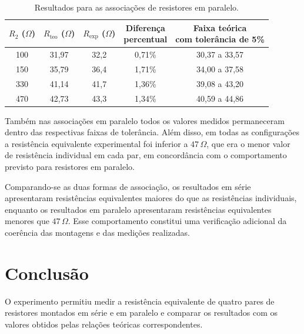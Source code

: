 \documentclass[a4paper,12pt]{article}
\begin{document}
\begin{table}[H]
  \centering
  \caption{Resultados para as associações de resistores em paralelo.}
  \label{tab:paralelo}
  \medskip

  \footnotesize
  \setlength{\tabcolsep}{4pt}
  \begin{tabular}{ccccc}
    \toprule
    \shortstack{$R_2$\\($\Omega$)}
    & \shortstack{$R_{\mathrm{teo}}$\\($\Omega$)}
    & \shortstack{$R_{\mathrm{exp}}$\\($\Omega$)}
    & \shortstack{\textbf{Diferença}\\\textbf{percentual}}
    & \shortstack{\textbf{Faixa teórica}\\\textbf{com tolerância de 5\%}} \\
    \midrule
    100 & 31,97 & 32,2 & 0,71\% & 30,37 a 33,57 \\
    150 & 35,79 & 36,4 & 1,71\% & 34,00 a 37,58 \\
    330 & 41,14 & 41,7 & 1,36\% & 39,08 a 43,20 \\
    470 & 42,73 & 43,3 & 1,34\% & 40,59 a 44,86 \\
    \bottomrule
  \end{tabular}
\end{table}

Também nas associações em paralelo todos os valores medidos permaneceram
dentro das respectivas faixas de tolerância. Além disso, em todas as
configurações a resistência equivalente experimental foi inferior a
$47\,\Omega$, que era o menor valor de resistência individual em cada par,
em concordância com o comportamento previsto para resistores em paralelo.

Comparando-se as duas formas de associação, os resultados em série apresentaram
resistências equivalentes maiores do que as resistências individuais, enquanto
os resultados em paralelo apresentaram resistências equivalentes menores que
$47\,\Omega$. Esse comportamento constitui uma verificação adicional da
coerência das montagens e das medições realizadas.

\section{Conclusão}

O experimento permitiu medir a resistência equivalente de quatro pares de
resistores montados em série e em paralelo e comparar os resultados com os
valores obtidos pelas relações teóricas correspondentes.
\end{document}
